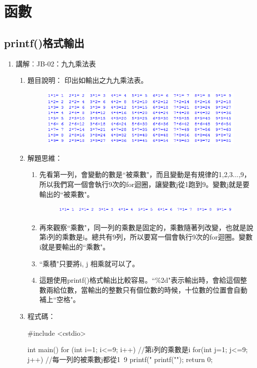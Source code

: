 \section{函數}
\subsection{printf()格式輸出}
\begin{enumerate}
	\item 講解︰JB-02：九九乘法表
		\begin{enumerate}
			\item 題目說明：
			\subitem 印出如輸出之九九乘法表。
			\begin{figure}[h]
				\centering
				\includegraphics[width=12cm]{fig/JB02fig}
			\end{figure}
			\item 解題思維：
			\begin{enumerate}
				\item 先看第一列，會變動的數是``被乘數"，而且變動是有規律的1,2,3...,9，所以我們寫一個會執行9次的for迴圈，讓變數j從1跑到9。變數j就是要輸出的``被乘數"。
				\begin{figure}[H]
					\centering
					\includegraphics[width=12cm]{fig/JB02fig_2}
				\end{figure}
				\item 再來觀察``乘數"，同一列的乘數是固定的，乘數隨著列改變，也就是說第i列的乘數是i。總共有9列，所以要寫一個會執行9次的for迴圈。變數i就是要輸出的``乘數"。
				\item ``乘積"只要將i, j 相乘就可以了。
				\item 這題使用printf()格式輸出比較容易。``\%2d"表示輸出時，會給這個整數兩給位數，當輸出的整數只有個位數的時候，十位數的位置會自動補上``空格"。
			\end{enumerate}
			
			\item 程式碼：
			\begin{cppcode}
			#include <cstdio>
			
			int main()
			{
				for (int i=1; i<=9; i++) {//第i列的乘數是i
					for(int j=1; j<=9; j++) {//每一列的被乘數j都從1~9
						printf("%
					}
					printf("\n");
				}
				return 0;
			}
				

\end{cppcode}
\end{enumerate}
\end{enumerate}
